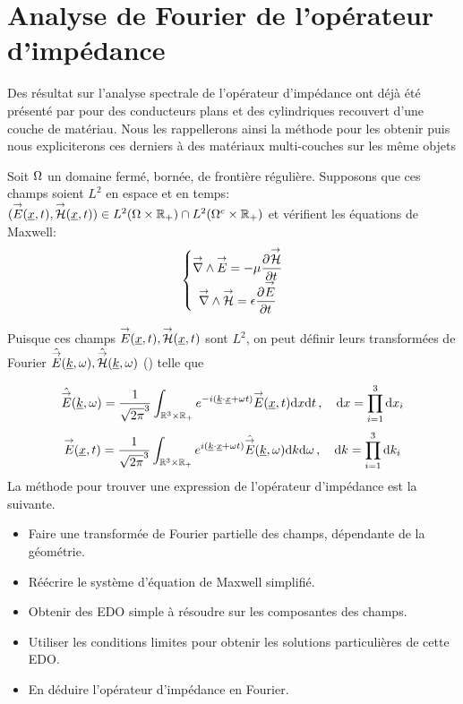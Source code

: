 \section{Analyse de Fourier de l'opérateur d'impédance}

Des résultat sur l'analyse spectrale de l'opérateur d'impédance ont déjà été présenté par \cite{hoppe_impedance_1995} pour des conducteurs plans et des cylindriques recouvert d'une couche de matériau. Nous les rappellerons ainsi la méthode pour les obtenir puis nous expliciterons ces derniers à des matériaux multi-couches sur les même objets


Soit $\Omega$ un domaine fermé, bornée, de frontière régulière. Supposons que ces champs soient $L^2$ en espace et en temps: $({\overset{\rightarrow}{E}}(\underline{x},t),{\overset{\rightarrow}{\mathcal{H}}}(\underline{x},t)) \in L^2(\Omega \times \mathbb R_+) \cap L^2(\Omega^c\times\mathbb R_+)$ et vérifient les équations de Maxwell:
\begin{equation}
    \left\lbrace 
    \begin{matrix}
    {\overset{\rightarrow}{\nabla}}\wedge {\overset{\rightarrow}{E}} = -\mu \dfrac{\partial^{{}} {\overset{\rightarrow}{\mathcal{H}}}}{{\partial t}^{{}}} \\
    {\overset{\rightarrow}{\nabla}}\wedge {\overset{\rightarrow}{\mathcal{H}}} = \epsilon \dfrac{\partial^{{}} {\overset{\rightarrow}{E}}}{{\partial t}^{{}}}
    \end{matrix}
    \right.
\end{equation}

Puisque ces champs ${\overset{\rightarrow}{E}}(\underline{x},t),{\overset{\rightarrow}{\mathcal{H}}}(\underline{x},t)$ sont $L^2$, on peut définir leurs transformées de Fourier $\hat{{\overset{\rightarrow}{E}}}(\underline{k},\omega), \hat{{\overset{\rightarrow}{\mathcal{H}}}}(\underline{k},\omega)$ (\cite[Théorème de Plancherel, p.~153]{yosida_functional_1995}) telle que

\begin{equation}
    \hat{{\overset{\rightarrow}{E}}} (\underline{k},\omega) = \dfrac{1}{\sqrt{2\pi}^3}\int_{\mathbb R^3\times\mathbb R_+} e^{-i(\underline{k} \cdot \underline{x}+\omega t)}{\overset{\rightarrow}{E}}(\underline{x},t) \mathrm{d}{x}\mathrm{d}{t}\,, \quad \mathrm{d} x = \prod\limits_{i=1}^3 \mathrm{d}{x_i}
\end{equation}
\begin{equation}
    {\overset{\rightarrow}{E}}(\underline{x},t) = \dfrac{1}{\sqrt{2\pi}^3}\int_{\mathbb R^3\times\mathbb R_+} e^{i(\underline{k} \cdot \underline{x}+\omega t)}\hat{{\overset{\rightarrow}{E}}} (\underline{k},\omega) \mathrm{d}{k} \mathrm{d}{\omega}\,, \quad \mathrm{d} k = \prod\limits_{i=1}^3 \mathrm{d}{k_i}
\end{equation}
La méthode pour trouver une expression de l'opérateur d'impédance est la suivante.
\begin{itemize}
\item Faire une transformée de Fourier partielle des champs, dépendante de la géométrie.
\item Réécrire le système d'équation de Maxwell simplifié.
\item Obtenir des EDO simple à résoudre sur les composantes des champs.
\item Utiliser les conditions limites pour obtenir les solutions particulières de cette EDO. 
\item En déduire l'opérateur d'impédance en Fourier.
\end{itemize}

